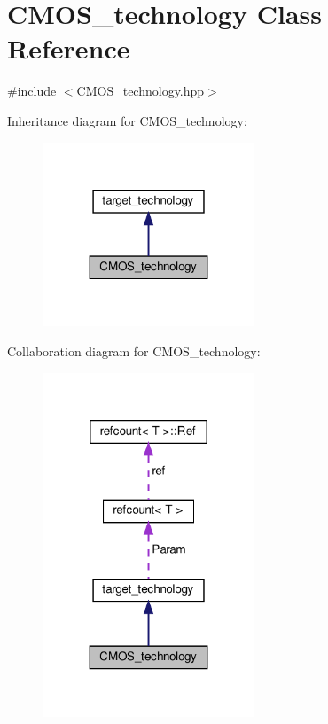 \hypertarget{classCMOS__technology}{}\section{C\+M\+O\+S\+\_\+technology Class Reference}
\label{classCMOS__technology}


{\ttfamily \#include $<$C\+M\+O\+S\+\_\+technology.\+hpp$>$}



Inheritance diagram for C\+M\+O\+S\+\_\+technology\+:
\nopagebreak
\begin{figure}[H]
\begin{center}
\leavevmode
\includegraphics[width=179pt]{df/d4d/classCMOS__technology__inherit__graph}
\end{center}
\end{figure}


Collaboration diagram for C\+M\+O\+S\+\_\+technology\+:
\nopagebreak
\begin{figure}[H]
\begin{center}
\leavevmode
\includegraphics[width=179pt]{d1/dbd/classCMOS__technology__coll__graph}
\end{center}
\end{figure}
